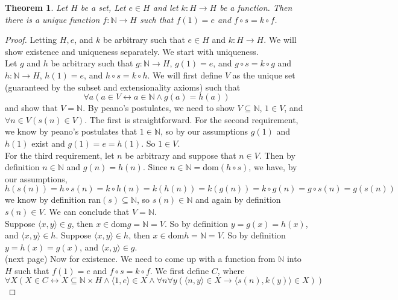 \documentclass{report}
\newtheorem{theorem}[theo]{Theorem}
\begin{document}
\begin{theorem}\label{recursion}
Let $H$ be a set, Let $e\in H$ and let $k:H\to H$ be a function. Then there is a unique function $f:\mathbb N\to H$ such that $f(1)=e$ and $f\circ s=k\circ f$.
\end{theorem}
\begin{proof}
Letting $H, e$, and $k$ be arbitrary such that $e\in H$ and $k:H\to H$. We will show existence and uniqueness separately. We start with uniqueness.\\
\indent Let $g$ and $h$ be arbitrary such that $g:\mathbb N\to H$, $g(1)=e$, and $g\circ s=k\circ g$ and $h:\mathbb N\to H$, $h(1)=e$, and $h\circ s=k\circ h$. We will first define $V$ as the 
unique set (guaranteed by the subset and extensionality axioms) such that
\begin{equation*}
\forall a(a\in V\leftrightarrow a\in\mathbb N\land g(a)=h(a))
\end{equation*}
and show that $V=\mathbb N$. By peano's postulates, we need to show $V\subseteq\mathbb N$, $1\in V$, and $\forall n\in V(s(n)\in V)$. The first is straightforward. For the second requirement, we 
know by peano's postulates that $1\in\mathbb N$, so by our assumptions $g(1)$ and $h(1)$ exist and
$g(1)=e=h(1)$. So $1\in V$.\\
\indent For the third requirement, let $n$ be arbitrary and suppose that $n\in V$. Then by definition $n\in\mathbb N$ and $g(n)=h(n)$. Since $n\in\mathbb N=\text{dom}(h\circ s)$, we have, by our 
assumptions,
\begin{equation*}
h(s(n))=h\circ s(n)=k\circ h(n)=k(h(n))=k(g(n))=k\circ g(n)=g\circ s(n)=g(s(n))
\end{equation*}
we know by definition ran$(s)\subseteq\mathbb N$, so $s(n)\in\mathbb N$ and again by definition
$s(n)\in V$. We can conclude that $V=\mathbb N$.\\
\indent Suppose $\langle x,y\rangle\in g$, then $x\in\text{dom}g=\mathbb N=V$. So by definition $y=g(x)=h(x)$, and $\langle x,y\rangle\in h$.
Suppose $\langle x,y\rangle\in h$, then $x\in\text{dom}h=\mathbb N=V$. So by definition $y=h(x)=g(x)$, and $\langle x,y\rangle\in g$.\\
(next page)\newpage
Now for existence. We need to come up with a function from $\mathbb N$ into $H$ such that $f(1)=e$ and $f\circ s=k\circ f$. We first define $C$, where
\begin{equation*}
\forall X(X\in C\leftrightarrow X\subseteq\mathbb N\times H\land\langle 1,e\rangle\in X\land\forall n\forall y(\langle n,y\rangle\in X\to\langle s(n),k(y)\rangle\in X))

\end{equation*}
\end{proof}
\end{document}
